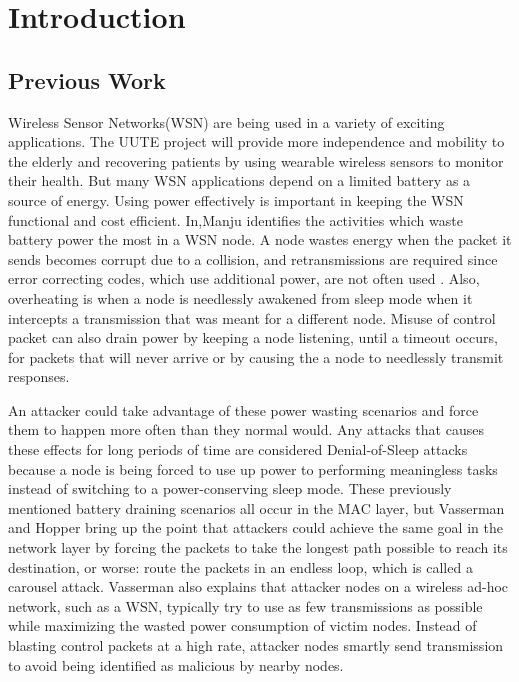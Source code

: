 \section{Introduction}
\subsection{Previous Work}
Wireless Sensor Networks(WSN) are being used in a variety of exciting 
applications. The UUTE project\cite{4561146} will provide more independence 
and mobility to the elderly and recovering patients by using wearable 
wireless sensors to monitor their health. But many WSN applications 
depend on a limited battery as a source of energy.  Using power 
effectively is important in keeping the WSN functional and cost efficient.
 In\cite{6558065},Manju identifies the activities which waste battery power 
the most in a WSN node.  A node wastes energy when the packet it sends 
becomes corrupt due to a collision, and retransmissions are required 
since error correcting codes, which use additional power, are not 
often used \cite{4476299}. Also, overheating is when a node is needlessly 
awakened from sleep mode when it intercepts a transmission that was 
meant for a different node.  Misuse of control packet \cite{6558065} can 
also drain power by keeping a node listening, until a timeout occurs, 
for packets that will never arrive or by causing the a node to needlessly 
transmit responses.
	

An attacker could take advantage of these power wasting scenarios and 
force them to happen more often than they normal would.  Any attacks 
that causes these effects for long periods of time are considered 
Denial-of-Sleep \cite{4476299} attacks because a node is being forced to 
use up power to performing meaningless tasks instead of switching to 
a power-conserving sleep mode. These previously mentioned battery draining
 scenarios all occur in the MAC layer, but Vasserman and Hopper\cite{6112758} 
bring up the point that attackers could achieve the same goal in the 
network layer by forcing the packets to take the longest path possible 
to reach its destination, or worse: route the packets in an endless loop, 
which is called a carousel attack.  Vasserman also explains that attacker 
nodes on a wireless ad-hoc network, such as a WSN, typically try to use 
as few transmissions as possible while maximizing the wasted power 
consumption of victim nodes. Instead of blasting control packets at a 
high rate, attacker nodes smartly send transmission to avoid being 
identified as malicious by nearby nodes.

